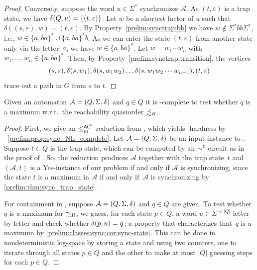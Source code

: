 \begin{proof}
	Conversely, suppose the word $u \in \Sigma^*$
	synchronizes $\mathcal A$.
	As $(t,\varepsilon)$ is a trap state, we have $\delta(Q,u) = \{(t,\varepsilon)\}$.
	Let $w$ be a shortest factor of $u$ such that $\delta((s,\varepsilon), w) = (t,\varepsilon)$.
	By Property~\ref{prelim:synctrap:bb} we have $w \notin \Sigma^* bb \Sigma^*$, i.e., 
	$w \in \{a,ba\}^* \cup \{a,ba\}^*b$.
	As we can enter the state $(t,\varepsilon)$ from another state only via the letter~$a$,
	we have $w \in \{a,ba\}^*$. 
	Let $w = w_1 \cdots w_n$ with 
	$w_1, \ldots, w_n \in \{a,ba\}^*$.
	Then, by Property~\ref{prelim:synctrap:transition}, the vertices
	\[
	(s,\varepsilon), \delta(s,w_1), \delta(s,w_1 w_2) \ldots
	\delta(s,w_1 w_2\cdots w_{n-1}), (t,\varepsilon) 
	\]
	trace out a path in $G$ from $s$ to $t$.		
\end{proof} 

\begin{proposition}\label{prelim:complexity:prop:maximum}
	Given an automaton $\mathcal A = (Q, \Sigma, \delta)$ and $q \in Q$
	it is \NL-complete to test whether $q$ is a maximum w.r.t.~the 
	reachability quasiorder $\precsim_R$.	
\end{proposition}
\begin{proof}
	First, we give
	an $\le_m^{\textup{\textsf{AC}}^0}$-reduction from \DFAST, which yields \NL-hardness by \PROP~\ref{prelim:prop:sync_NL_complete}.
	Let $\mathcal A = (Q, \Sigma, \delta)$
	be an input instance to \DFAST.
	Suppose $t \in Q$ is the trap state, which 
	can be computed by an $\AC^0$-circuit as 
	in the proof of .
	So, the reduction produces $\mathcal A$ together with the trap state~$t$
	and $(\mathcal A, t)$ is a {\sc Yes}-instance of our problem
	if and only if $\mathcal A$ is synchronizing,
	since the state $t$ is a maximum in $\mathcal A$
	if and only if~$\mathcal A$ is synchronizing by \cref{prelim:thm:sync_trap_state}.
		
	For containment in \NL, suppose $\mathcal A = (Q, \Sigma, \delta)$ and $q \in Q$
	are given.
	To test whether $q$ is a maximum for $\precsim_R$,
	we guess, for each state $p \in Q$,
	a word $u \in \Sigma^{<|Q|}$
	letter by letter and check whether $\delta(p,u) = q$; a property that characterizes that~$q$ is a maximum
	by \cref{prelim:classes:sync:cor:sync-state}.
	This can be 
	done in nondeterministic log-space
	by storing a state
	and using two counters, one to iterate through all states $p \in Q$
	and the other to make at most $|Q|$ guessing steps for each $p \in Q$.	
\end{proof}

